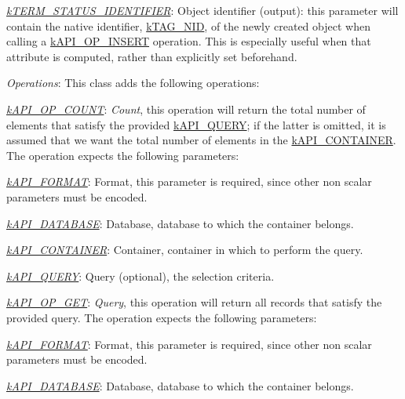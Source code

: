 \begin{DoxyItemize}
\begin{DoxyItemize}
\begin{DoxyItemize}
\item {\itshape \hyperlink{}{k\-T\-E\-R\-M\-\_\-\-S\-T\-A\-T\-U\-S\-\_\-\-I\-D\-E\-N\-T\-I\-F\-I\-E\-R}}\-: Object identifier (output)\-: this parameter will contain the native identifier, \hyperlink{}{k\-T\-A\-G\-\_\-\-N\-I\-D}, of the newly created object when calling a \hyperlink{}{k\-A\-P\-I\-\_\-\-O\-P\-\_\-\-I\-N\-S\-E\-R\-T} operation. This is especially useful when that attribute is computed, rather than explicitly set beforehand. 
\end{DoxyItemize}
\end{DoxyItemize}
\item {\itshape Operations}\-: This class adds the following operations\-: 
\begin{DoxyItemize}
\item {\itshape \hyperlink{}{k\-A\-P\-I\-\_\-\-O\-P\-\_\-\-C\-O\-U\-N\-T}}\-: {\itshape Count}, this operation will return the total number of elements that satisfy the provided \hyperlink{}{k\-A\-P\-I\-\_\-\-Q\-U\-E\-R\-Y}; if the latter is omitted, it is assumed that we want the total number of elements in the \hyperlink{}{k\-A\-P\-I\-\_\-\-C\-O\-N\-T\-A\-I\-N\-E\-R}. The operation expects the following parameters\-: 
\begin{DoxyItemize}
\item {\itshape \hyperlink{}{k\-A\-P\-I\-\_\-\-F\-O\-R\-M\-A\-T}}\-: Format, this parameter is required, since other non scalar parameters must be encoded. 
\item {\itshape \hyperlink{}{k\-A\-P\-I\-\_\-\-D\-A\-T\-A\-B\-A\-S\-E}}\-: Database, database to which the container belongs. 
\item {\itshape \hyperlink{}{k\-A\-P\-I\-\_\-\-C\-O\-N\-T\-A\-I\-N\-E\-R}}\-: Container, container in which to perform the query. 
\item {\itshape \hyperlink{}{k\-A\-P\-I\-\_\-\-Q\-U\-E\-R\-Y}}\-: Query (optional), the selection criteria. 
\end{DoxyItemize}
\item {\itshape \hyperlink{}{k\-A\-P\-I\-\_\-\-O\-P\-\_\-\-G\-E\-T}}\-: {\itshape Query}, this operation will return all records that satisfy the provided query. The operation expects the following parameters\-: 
\begin{DoxyItemize}
\item {\itshape \hyperlink{}{k\-A\-P\-I\-\_\-\-F\-O\-R\-M\-A\-T}}\-: Format, this parameter is required, since other non scalar parameters must be encoded. 
\item {\itshape \hyperlink{}{k\-A\-P\-I\-\_\-\-D\-A\-T\-A\-B\-A\-S\-E}}\-: Database, database to which the container belongs. 

\end{DoxyItemize}
\end{DoxyItemize}
\end{DoxyItemize}
